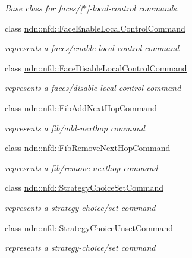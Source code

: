 \begin{DoxyCompactItemize}
\begin{DoxyCompactList}\small\item\em Base class for faces/\mbox{[}$\ast$\mbox{]}-\/local-\/control commands. \end{DoxyCompactList}\item 
class \hyperlink{classndn_1_1nfd_1_1FaceEnableLocalControlCommand}{ndn\+::nfd\+::\+Face\+Enable\+Local\+Control\+Command}
\begin{DoxyCompactList}\small\item\em represents a faces/enable-\/local-\/control command \end{DoxyCompactList}\item 
class \hyperlink{classndn_1_1nfd_1_1FaceDisableLocalControlCommand}{ndn\+::nfd\+::\+Face\+Disable\+Local\+Control\+Command}
\begin{DoxyCompactList}\small\item\em represents a faces/disable-\/local-\/control command \end{DoxyCompactList}\item 
class \hyperlink{classndn_1_1nfd_1_1FibAddNextHopCommand}{ndn\+::nfd\+::\+Fib\+Add\+Next\+Hop\+Command}
\begin{DoxyCompactList}\small\item\em represents a fib/add-\/nexthop command \end{DoxyCompactList}\item 
class \hyperlink{classndn_1_1nfd_1_1FibRemoveNextHopCommand}{ndn\+::nfd\+::\+Fib\+Remove\+Next\+Hop\+Command}
\begin{DoxyCompactList}\small\item\em represents a fib/remove-\/nexthop command \end{DoxyCompactList}\item 
class \hyperlink{classndn_1_1nfd_1_1StrategyChoiceSetCommand}{ndn\+::nfd\+::\+Strategy\+Choice\+Set\+Command}
\begin{DoxyCompactList}\small\item\em represents a strategy-\/choice/set command \end{DoxyCompactList}\item 
class \hyperlink{classndn_1_1nfd_1_1StrategyChoiceUnsetCommand}{ndn\+::nfd\+::\+Strategy\+Choice\+Unset\+Command}
\begin{DoxyCompactList}\small\item\em represents a strategy-\/choice/set command \end{DoxyCompactList}\item 

\end{DoxyCompactItemize}
